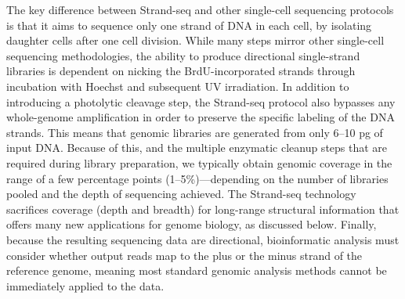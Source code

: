 The key difference between Strand-seq and other single-cell
sequencing protocols is that it aims to sequence only one strand of
DNA in each cell, by isolating daughter cells after one cell division.
While many steps mirror other single-cell sequencing methodologies,
the ability to produce directional single-strand libraries is
dependent on nicking the BrdU-incorporated strands through incubation
with Hoechst and subsequent UV irradiation. In addition
to introducing a photolytic cleavage step, the Strand-seq protocol
also bypasses any whole-genome amplification in order to preserve
the specific labeling of the DNA strands. This means that genomic
libraries are generated from only 6–10 pg of input DNA. Because
of this, and the multiple enzymatic cleanup steps that are required
during library preparation, we typically obtain genomic coverage
in the range of a few percentage points (1–5\%)—depending on the
number of libraries pooled and the depth of sequencing achieved.
The Strand-seq technology sacrifices coverage (depth and breadth)
for long-range structural information that offers many new applications
for genome biology, as discussed below. Finally, because the
resulting sequencing data are directional, bioinformatic analysis
must consider whether output reads map to the plus or the minus
strand of the reference genome, meaning most standard genomic
analysis methods cannot be immediately applied to the data.


